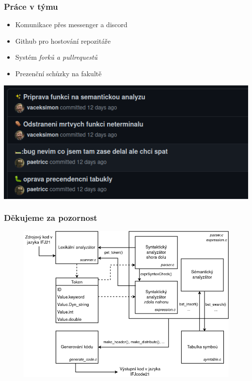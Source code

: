 \begin{frame}
  \frametitle{Práce v týmu}
  \begin{itemize}
    \setlength\itemsep{1em}
        \item Komunikace přes messenger a discord
        \item Github pro hostování repozitáře
        \item Systém \emph{forků a pullrequestů}
        \item Prezenční schůzky na fakultě
    \end{itemize}

  \vspace{1em}

  \centering
  \includegraphics[scale=0.4,keepaspectratio]{img/commit_kekw.png}
\end{frame}


\appendix{}
\begin{frame}
  \frametitle{Děkujeme za pozornost}
    \begin{figure}[htbp]
        \centering
        \includegraphics[width=\textwidth,height=\textheight,keepaspectratio]{img/DiagramFinal2.png}
        \label{fig:my_label}
    \end{figure}

\end{frame}



